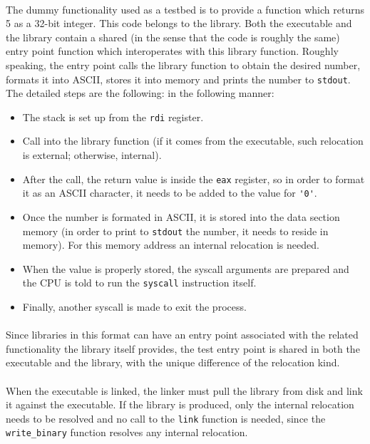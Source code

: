 \documentclass[12pt]{article}
\begin{document}
	\paragraph{}The dummy functionality used as a testbed is to provide a function which returns 5 as a 32-bit integer. This code belongs to the library. Both the executable and the library contain a shared (in the sense that the code is roughly the same) entry point function which interoperates with this library function. Roughly speaking, the entry point calls the library function to obtain the desired number, formats it into \acrshort{ASCII}, stores it into memory and prints the number to \verb|stdout|. The detailed steps are the following:
	in the following manner:
	\begin{itemize}
		\item The stack is set up from the \verb|rdi| register.
		\item Call into the library function (if it comes from the executable, such relocation is external; otherwise, internal).
		\item After the call, the return value is inside the \verb|eax| register, so in order to format it as an ASCII character, it needs to be added to the value for \verb|'0'|.
		\item Once the number is formated in \acrshort{ASCII}, it is stored into the data section memory (in order to print to \verb|stdout| the number, it needs to reside in memory). For this memory address an internal relocation is needed.
		\item When the value is properly stored, the syscall arguments are prepared and the CPU is told to run the \verb|syscall| instruction itself.
		\item Finally, another syscall is made to exit the process.
	\end{itemize}
	
	\paragraph{}Since libraries in this format can have an entry point associated with the related functionality the library itself provides, the test entry point is shared in both the executable and the library, with the unique difference of the relocation kind.
	\paragraph{}When the executable is linked, the linker must pull the library from disk and link it against the executable. If the library is produced, only the internal relocation needs to be resolved and no call to the \verb|link| function is needed, since the \verb|write_binary| function resolves any internal relocation.
	
\end{document}
